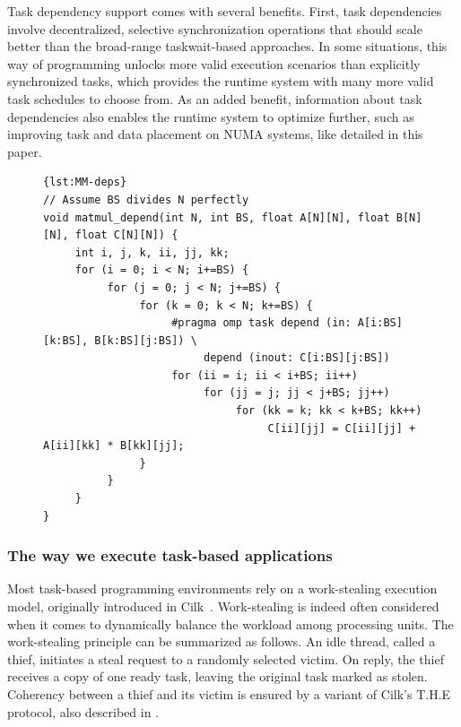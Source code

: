 \documentclass{Styles/llncs}
\begin{document}
Task dependency support comes with several benefits. 
First, task dependencies involve decentralized, selective synchronization operations that should scale better than the broad-range taskwait-based approaches.
In some situations, this way of programming unlocks more valid execution scenarios than explicitly synchronized tasks, which provides the runtime system with many more valid task schedules to choose from. 
As an added benefit, information about task dependencies also enables the runtime system to optimize further, such as improving task and data placement on NUMA systems, like detailed in this paper.

\vspace{-0.5cm}

\begin{figure}[htbp]
\begin{lstlisting}[caption=Blocked matrix multiplication with OpenMP task dependencies,frame=tlrb,style=smaller,label=lst:MM-deps]{lst:MM-deps}
// Assume BS divides N perfectly
void matmul_depend(int N, int BS, float A[N][N], float B[N][N], float C[N][N]) {
     int i, j, k, ii, jj, kk;
     for (i = 0; i < N; i+=BS) {
          for (j = 0; j < N; j+=BS) {
               for (k = 0; k < N; k+=BS) {
                    #pragma omp task depend (in: A[i:BS][k:BS], B[k:BS][j:BS]) \
                         depend (inout: C[i:BS][j:BS])
                    for (ii = i; ii < i+BS; ii++)
                         for (jj = j; jj < j+BS; jj++)
                              for (kk = k; kk < k+BS; kk++)
                                   C[ii][jj] = C[ii][jj] + A[ii][kk] * B[kk][jj];
               }
          }
     }
}
\end{lstlisting}
\end{figure}

\vspace{-1cm}

\subsubsection{The way we execute task-based applications}

Most task-based programming environments rely on a work-stealing execution model, originally introduced in Cilk~\cite{cilk5}. 
Work-stealing is indeed often considered when it comes to dynamically balance the workload among processing units. 
The work-stealing principle can be summarized as follows. 
An idle thread, called a thief, initiates a steal request to a randomly selected victim. 
On reply, the thief receives a copy of one ready task, leaving the original task marked as stolen.
Coherency between a thief and its victim is ensured by a variant of Cilk's T.H.E protocol, also described in \cite{cilk5}.
\end{document}
